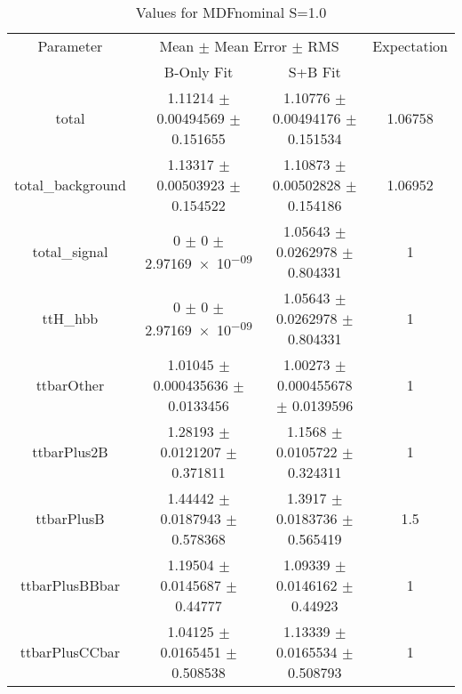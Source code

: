 \begin{table}
\centering
\caption{Values for MDFnominal S=1.0}
\begin{tabular}{cccc}
\toprule
Parameter & \multicolumn{2}{c}{Mean $\pm$ Mean Error $\pm$ RMS} & Expectation\\
 & B-Only Fit & S+B Fit & \\
\midrule
total & \num{1.11214} $\pm$ \num{0.00494569} $\pm$ \num{0.151655} & \num{1.10776} $\pm$ \num{0.00494176} $\pm$ \num{0.151534} & \num{1.06758}\\
total\_background & \num{1.13317} $\pm$ \num{0.00503923} $\pm$ \num{0.154522} & \num{1.10873} $\pm$ \num{0.00502828} $\pm$ \num{0.154186} & \num{1.06952}\\
total\_signal & \num{0} $\pm$ \num{0} $\pm$ \num{2.97169e-09} & \num{1.05643} $\pm$ \num{0.0262978} $\pm$ \num{0.804331} & \num{1}\\
ttH\_hbb & \num{0} $\pm$ \num{0} $\pm$ \num{2.97169e-09} & \num{1.05643} $\pm$ \num{0.0262978} $\pm$ \num{0.804331} & \num{1}\\
ttbarOther & \num{1.01045} $\pm$ \num{0.000435636} $\pm$ \num{0.0133456} & \num{1.00273} $\pm$ \num{0.000455678} $\pm$ \num{0.0139596} & \num{1}\\
ttbarPlus2B & \num{1.28193} $\pm$ \num{0.0121207} $\pm$ \num{0.371811} & \num{1.1568} $\pm$ \num{0.0105722} $\pm$ \num{0.324311} & \num{1}\\
ttbarPlusB & \num{1.44442} $\pm$ \num{0.0187943} $\pm$ \num{0.578368} & \num{1.3917} $\pm$ \num{0.0183736} $\pm$ \num{0.565419} & \num{1.5}\\
ttbarPlusBBbar & \num{1.19504} $\pm$ \num{0.0145687} $\pm$ \num{0.44777} & \num{1.09339} $\pm$ \num{0.0146162} $\pm$ \num{0.44923} & \num{1}\\
ttbarPlusCCbar & \num{1.04125} $\pm$ \num{0.0165451} $\pm$ \num{0.508538} & \num{1.13339} $\pm$ \num{0.0165534} $\pm$ \num{0.508793} & \num{1}\\
\bottomrule
\end{tabular}
\end{table}
